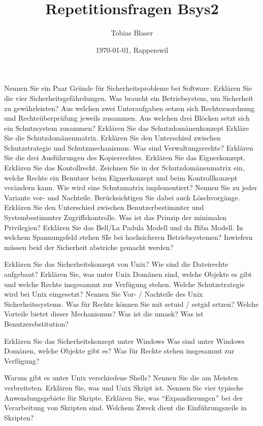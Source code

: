 \documentclass[ngerman,a4paper,12pt]{scrreprt}
\title{Repetitionsfragen Bsys2}
\author{Tobias Blaser}
\date{\today{}, Rapperswil}
\begin{document}
\tableofcontents
\clearpage


\ol
	\li Nennen Sie ein Paar Gründe für Sicherheitsprobleme bei Software.
	\li Erklären Sie die vier Sicherheitsgefährdungen.
	\li Was braucht ein Betriebsystem, um Sicherheit zu gewährleisten?
	\li Aus welchen zwei Unteraufgaben setzen sich Rechtezuordnung und Rechteüberprüfung jeweils zusammen.
	\li Aus welchen drei Blöcken setzt sich ein Schutzsystem zusammen?
	\li Erklären Sie das Schutzdomänenkonzept
	\li Erkläre Sie die Schutzdomänenmatrix.
	\li Erklären Sie den Unterschied zwischen Schutzstrategie und Schutzmechanismus.
	\li Was sind Verwaltungsrechte?
	\li Erklären Sie die drei Ausführungen des Kopierrechtes.
	\li Erklären Sie das Eignerkonzept.
	\li Erklären Sie das Kontollrecht.
	\li Zeichnen Sie in der Schutzdomänenmatrix ein, welche Rechte ein Benutzer beim Eignerkonzept und beim Kontrollkonzept verändern kann.
	\li Wie wird eine Schutzmatrix implementiert? Nennen Sie zu jeder Variante vor- und Nachteile. Berücksichtigen Sie dabei auch Löschvorgänge.
	\li Erklären Sie den Unterschied zwischen Benutzerbestimmter und Systembestimmter Zugriffskontrolle.
	\li Was ist das Prinzip der minimalen Privilegien?
	\li Erklären Sie das Bell/La Padula Modell und da Biba Modell.
	\li In welchem Spannungsfeld stehen SIe bei hochsicheren Betriebsystemen? Inwiefern müssen beid der Sicherheit abstriche gemacht werden?
\olS

\olR
	\li Erklären Sie das Sicherheitskonzept von Unix? Wie sind die Dateirechte aufgebaut?
	\li Erklären Sie, was unter Unix Domänen sind, welche Objekte es gibt und welche Rechte insgesammt zur Verfügung stehen.
	\li Welche Schutzstrategie wird bei Unix eingesetzt?
	\li Nennen Sie Vor- / Nachteile des Unix Sicherheitssystems.
	\li Was für Rechte können Sie mit setuid / setgid srtzen? Welche Vorteile bietet dieser Mechanismus?
	\li Was ist die umask?
	\li Was ist Benutzersbstitution?
\olS

\olR
	\li Erklären Sie das Sicherheitskonzept unter Windows
	\li Was sind unter Windows Domänen, welche Objekte gibt es? Was für Rechte stehen insgesammt zur Verfügung?
	
\olS


\olR
	\li Warum gibt es unter Unix verschiedene Shells? Nennen Sie die am Meisten verbreiteten.
	\li Erklären Sie, was und Unix Skript ist.
	\li Nennen Sie vier typische Anwendungsgebiete für Skripte.
	\li Erklären Sie, was ``Expandierungen'' bei der Verarbeitung von Skripten sind.
	\li Welchem Zweck dient die Einführungszeile in Skripten?
\olS
\end{document}
